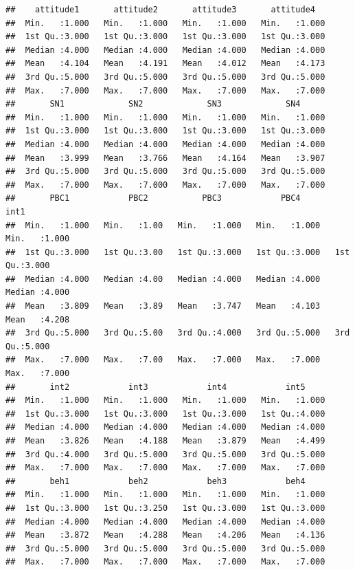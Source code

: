 \documentclass[
]{article}
\begin{document}
\begin{verbatim}
##    attitude1       attitude2       attitude3       attitude4    
##  Min.   :1.000   Min.   :1.000   Min.   :1.000   Min.   :1.000  
##  1st Qu.:3.000   1st Qu.:3.000   1st Qu.:3.000   1st Qu.:3.000  
##  Median :4.000   Median :4.000   Median :4.000   Median :4.000  
##  Mean   :4.104   Mean   :4.191   Mean   :4.012   Mean   :4.173  
##  3rd Qu.:5.000   3rd Qu.:5.000   3rd Qu.:5.000   3rd Qu.:5.000  
##  Max.   :7.000   Max.   :7.000   Max.   :7.000   Max.   :7.000  
##       SN1             SN2             SN3             SN4       
##  Min.   :1.000   Min.   :1.000   Min.   :1.000   Min.   :1.000  
##  1st Qu.:3.000   1st Qu.:3.000   1st Qu.:3.000   1st Qu.:3.000  
##  Median :4.000   Median :4.000   Median :4.000   Median :4.000  
##  Mean   :3.999   Mean   :3.766   Mean   :4.164   Mean   :3.907  
##  3rd Qu.:5.000   3rd Qu.:5.000   3rd Qu.:5.000   3rd Qu.:5.000  
##  Max.   :7.000   Max.   :7.000   Max.   :7.000   Max.   :7.000  
##       PBC1            PBC2           PBC3            PBC4            int1      
##  Min.   :1.000   Min.   :1.00   Min.   :1.000   Min.   :1.000   Min.   :1.000  
##  1st Qu.:3.000   1st Qu.:3.00   1st Qu.:3.000   1st Qu.:3.000   1st Qu.:3.000  
##  Median :4.000   Median :4.00   Median :4.000   Median :4.000   Median :4.000  
##  Mean   :3.809   Mean   :3.89   Mean   :3.747   Mean   :4.103   Mean   :4.208  
##  3rd Qu.:5.000   3rd Qu.:5.00   3rd Qu.:4.000   3rd Qu.:5.000   3rd Qu.:5.000  
##  Max.   :7.000   Max.   :7.00   Max.   :7.000   Max.   :7.000   Max.   :7.000  
##       int2            int3            int4            int5      
##  Min.   :1.000   Min.   :1.000   Min.   :1.000   Min.   :1.000  
##  1st Qu.:3.000   1st Qu.:3.000   1st Qu.:3.000   1st Qu.:4.000  
##  Median :4.000   Median :4.000   Median :4.000   Median :4.000  
##  Mean   :3.826   Mean   :4.188   Mean   :3.879   Mean   :4.499  
##  3rd Qu.:4.000   3rd Qu.:5.000   3rd Qu.:5.000   3rd Qu.:5.000  
##  Max.   :7.000   Max.   :7.000   Max.   :7.000   Max.   :7.000  
##       beh1            beh2            beh3            beh4      
##  Min.   :1.000   Min.   :1.000   Min.   :1.000   Min.   :1.000  
##  1st Qu.:3.000   1st Qu.:3.250   1st Qu.:3.000   1st Qu.:3.000  
##  Median :4.000   Median :4.000   Median :4.000   Median :4.000  
##  Mean   :3.872   Mean   :4.288   Mean   :4.206   Mean   :4.136  
##  3rd Qu.:5.000   3rd Qu.:5.000   3rd Qu.:5.000   3rd Qu.:5.000  
##  Max.   :7.000   Max.   :7.000   Max.   :7.000   Max.   :7.000
\end{verbatim}
\end{document}
